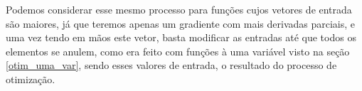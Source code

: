 
Podemos considerar esse mesmo processo para funções cujos vetores de entrada são
maiores, já que teremos apenas um gradiente com mais derivadas parciais, e uma
vez tendo em mãos este vetor, basta modificar as entradas até que todos os
elementos se anulem, como era feito com funções à uma variável visto na
seção \ref{otim_uma_var}, sendo esses valores de entrada, o resultado do
processo de otimização.




%
